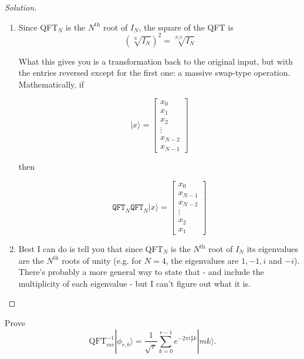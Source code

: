 \documentclass[12pt]{article}
\newenvironment{problem}[2][Problem]{\begin{trivlist}
\item[\hskip \labelsep {\bfseries #1}\hskip \labelsep {\bfseries #2.}]}{\end{trivlist}}
\begin{document}
\begin{proof}[Solution]~\\
\begin{enumerate}[label=(\alph*)]
\item Since QFT$_N$ is the $N^{\text{th}}$ root of $I_N$, the square of the QFT is 
$$\left(\sqrt[N]{I_N}\right)^2=\sqrt[N/2]{I_N}$$

What this gives you is a transformation back to the original input, but with the entries reversed except for the first one: a massive swap-type operation. Mathematically, if

$$|x\rangle=\begin{bmatrix}
x_0\\x_1\\x_2\\\vdots\\x_{N-2}\\x_{N-1}
\end{bmatrix}$$

\centering then

$$\texttt{QFT}_N\texttt{QFT}_N|x\rangle=\begin{bmatrix}
x_0\\x_{N-1}\\x_{N-2}\\\vdots\\x_2\\x_1\end{bmatrix}$$

\raggedright

\item Best I can do is tell you that since QFT$_N$ is the $N^{\text{th}}$ root of $I_N$ its eigenvalues are the $N^{\text{th}}$ roots of unity (e.g. for $N=4$, the eigenvalues are $1,-1,i$ and $-i$). There's probably a more general way to state that - and include the multiplicity of each eigenvalue - but I can't figure out what it is.
\end{enumerate}
\end{proof}

\begin{problem}{7.1.5}
Prove
$$\text{QFT}^{-1}_{mr}|\phi_{r,b}\rangle=\frac{1}{\sqrt{r}}\sum_{k=0}^{r-1}e^{-2\pi i\frac{b}{r}k}|mk\rangle.$$
\end{problem}
\end{document}
